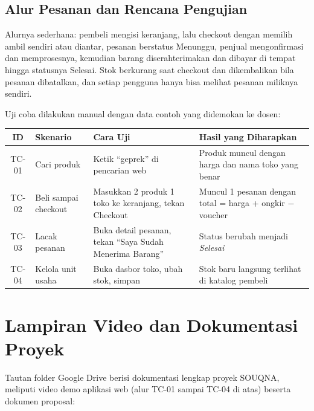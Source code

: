 \documentclass[11pt, a4paper]{article}
\begin{document}
\subsection{Alur Pesanan dan Rencana Pengujian}

Alurnya sederhana: pembeli mengisi keranjang, lalu checkout dengan memilih ambil sendiri atau diantar, pesanan berstatus Menunggu, penjual mengonfirmasi dan memprosesnya, kemudian barang diserahterimakan dan dibayar di tempat hingga statusnya Selesai. Stok berkurang saat checkout dan dikembalikan bila pesanan dibatalkan, dan setiap pengguna hanya bisa melihat pesanan miliknya sendiri.

Uji coba dilakukan manual dengan data contoh yang didemokan ke dosen:

\vspace{0.1cm}
\noindent\small
\begin{tabularx}{\textwidth}{@{} c >{\raggedright\arraybackslash}p{3cm} >{\raggedright\arraybackslash}p{4.5cm} >{\raggedright\arraybackslash}X @{}}
\toprule
\textbf{ID} & \textbf{Skenario} & \textbf{Cara Uji} & \textbf{Hasil yang Diharapkan} \\
\midrule
TC-01 & Cari produk &
  Ketik ``geprek'' di pencarian web &
  Produk muncul dengan harga dan nama toko yang benar \\
\addlinespace
TC-02 & Beli sampai checkout &
  Masukkan 2 produk 1 toko ke keranjang, tekan Checkout &
  Muncul 1 pesanan dengan total = harga + ongkir $-$ voucher \\
\addlinespace
TC-03 & Lacak pesanan &
  Buka detail pesanan, tekan ``Saya Sudah Menerima Barang'' &
  Status berubah menjadi \textit{Selesai} \\
\addlinespace
TC-04 & Kelola unit usaha &
  Buka dasbor toko, ubah stok, simpan &
  Stok baru langsung terlihat di katalog pembeli \\
\bottomrule
\end{tabularx}

\vspace{0.4cm}
\normalsize

\section{Lampiran Video dan Dokumentasi Proyek}

Tautan folder Google Drive berisi dokumentasi lengkap proyek SOUQNA, meliputi video demo aplikasi web (alur TC-01 sampai TC-04 di atas) beserta dokumen proposal:
\end{document}
